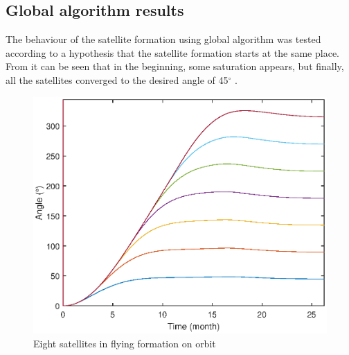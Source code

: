 \subsection{Global algorithm results}
The behaviour of the satellite formation using global algorithm was tested according to a hypothesis that the satellite formation starts at the same place. From  it can be seen that in the beginning, some saturation appears, but finally, all the satellites converged to the desired angle of 45$^{\circ}$ .
\begin{figure}[H]
	\centering
	\includegraphics[width=1\linewidth]{figures/gl.eps}
	\caption{Eight satellites in flying formation on orbit}
	\label{fig:forr}
\end{figure}
